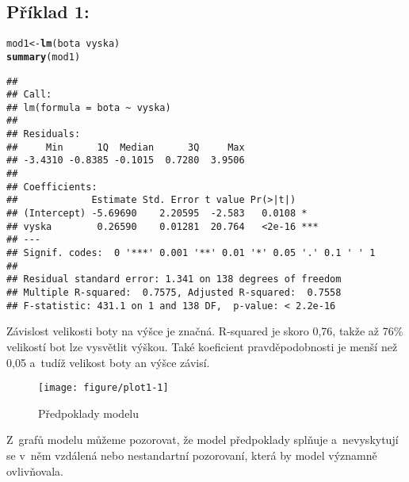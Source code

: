 \documentclass[twoside]{article}\usepackage[]{graphicx}\usepackage[]{color}
\makeatletter
\def\maxwidth{ %
  \ifdim\Gin@nat@width>\linewidth
    \linewidth
  \else
    \Gin@nat@width
  \fi
}
\newcommand{\hlopt}[1]{\textcolor[rgb]{0,0,0}{#1}}%
\newcommand{\hlstd}[1]{\textcolor[rgb]{0.345,0.345,0.345}{#1}}%
\newcommand{\hlkwb}[1]{\textcolor[rgb]{0.69,0.353,0.396}{#1}}%
\newcommand{\hlkwd}[1]{\textcolor[rgb]{0.737,0.353,0.396}{\textbf{#1}}}%
\newenvironment{kframe}{%
 \def\at@end@of@kframe{}%
 \ifinner\ifhmode%
  \def\at@end@of@kframe{\end{minipage}}%
  \begin{minipage}{\columnwidth}%
 \fi\fi%
 \def\FrameCommand##1{\hskip\@totalleftmargin \hskip-\fboxsep
 \colorbox{shadecolor}{##1}\hskip-\fboxsep
     \hskip-\linewidth \hskip-\@totalleftmargin \hskip\columnwidth}%
 \MakeFramed {\advance\hsize-\width
   \@totalleftmargin\z@ \linewidth\hsize
   \@setminipage}}%
 {\par\unskip\endMakeFramed%
 \at@end@of@kframe}
\newenvironment{knitrout}{}{} %
\makeatother
\begin{document}
\subsection*{Příklad 1:}
\begin{knitrout}
\color{fgcolor}\begin{kframe}
\begin{alltt}
\hlstd{mod1} \hlkwb{<-} \hlkwd{lm}\hlstd{(bota}\hlopt{~}\hlstd{vyska)}
\hlkwd{summary}\hlstd{(mod1)}
\end{alltt}
\begin{verbatim}
## 
## Call:
## lm(formula = bota ~ vyska)
## 
## Residuals:
##     Min      1Q  Median      3Q     Max 
## -3.4310 -0.8385 -0.1015  0.7280  3.9506 
## 
## Coefficients:
##             Estimate Std. Error t value Pr(>|t|)    
## (Intercept) -5.69690    2.20595  -2.583   0.0108 *  
## vyska        0.26590    0.01281  20.764   <2e-16 ***
## ---
## Signif. codes:  0 '***' 0.001 '**' 0.01 '*' 0.05 '.' 0.1 ' ' 1
## 
## Residual standard error: 1.341 on 138 degrees of freedom
## Multiple R-squared:  0.7575,	Adjusted R-squared:  0.7558 
## F-statistic: 431.1 on 1 and 138 DF,  p-value: < 2.2e-16
\end{verbatim}
\end{kframe}
\end{knitrout}
Závislost velikosti boty na výšce je značná. R-squared je skoro 0,76, takže až 76\% velikostí bot lze vysvětlit výškou. Také koeficient pravděpodobnosti je menší než 0,05 a~tudíž velikost boty an výšce závisí.

\newpage
\begin{knitrout}
\color{fgcolor}\begin{figure}[h]
\texttt{[image: figure/plot1-1]} \caption[Předpoklady modelu]{Předpoklady modelu}\label{fig:plot1}
\end{figure}


\end{knitrout}
Z~grafů modelu můžeme pozorovat, že model předpoklady splňuje a~nevyskytují se v~něm vzdálená nebo nestandartní pozorovaní, která by model významně ovlivňovala.
\end{document}
